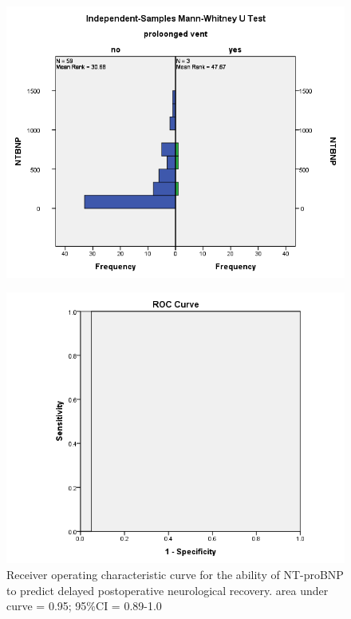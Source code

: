 \documentclass[14pt,a4paper,onecolumn]{extarticle}
\begin{document}
\clearpage
\begin{figure}
    \centering
    \includegraphics[scale=0.7]{../images/manwhit_vent.png}
    \small\caption{}
    \label{}
\end{figure}

\clearpage
\begin{figure}
    \centering
    \includegraphics[scale=0.7]{../images/roc_recovery.png}
    \small\caption{Receiver operating characteristic curve for the ability of NT-proBNP to predict delayed postoperative neurological recovery.  area under curve = 0.95; 95\%CI = 0.89-1.0}
    \label{}
\end{figure}
\end{document}
